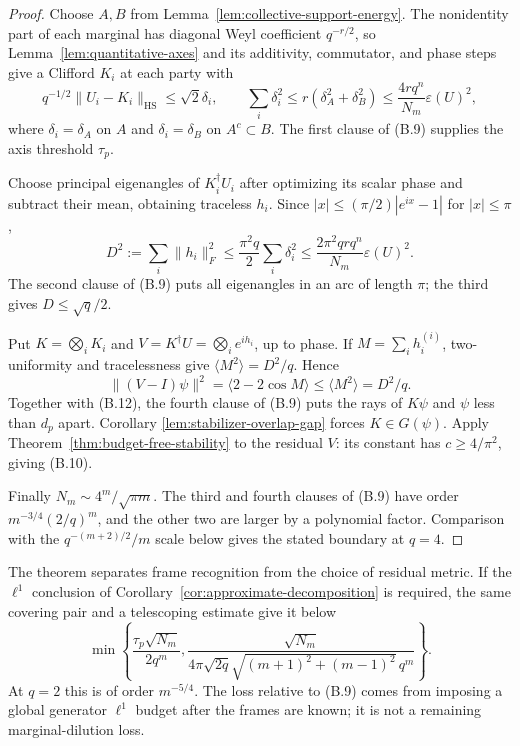 \begin{proof}
Choose \(A,B\) from Lemma~\ref{lem:collective-support-energy}.  The
nonidentity part of each marginal has diagonal Weyl coefficient
\(q^{-r/2}\), so Lemma~\ref{lem:quantitative-axes} and its
additivity, commutator, and phase steps give a Clifford \(K_i\) at each
party with
\[
 q^{-1/2}\lVert U_i-K_i\rVert_{\mathrm{HS}}
 \leq\sqrt2\delta_i,\qquad
 \sum_i\delta_i^2
 \leq r(\delta_A^2+\delta_B^2)
 \leq\frac{4rq^n}{N_m}\varepsilon(U)^2,          \tag{B.11}
\]
where \(\delta_i=\delta_A\) on \(A\) and \(\delta_i=\delta_B\) on
\(A^c\subset B\).  The first clause of (B.9) supplies the axis threshold
\(\tau_p\).

Choose principal eigenangles of \(K_i^\dagger U_i\) after optimizing its
scalar phase and subtract their mean, obtaining traceless \(h_i\).
Since \(|x|\leq(\pi/2)|e^{ix}-1|\) for \(|x|\leq\pi\),
\[
 D^2:=\sum_i\lVert h_i\rVert_F^2
 \leq\frac{\pi^2q}{2}\sum_i\delta_i^2
 \leq\frac{2\pi^2qrq^n}{N_m}\varepsilon(U)^2.   \tag{B.12}
\]
The second clause of (B.9) puts all eigenangles in an arc of length
\(\pi\); the third gives \(D\leq\sqrt q/2\).

Put \(K=\bigotimes_iK_i\) and
\(V=K^\dagger U=\bigotimes_ie^{ih_i}\), up to phase.  If
\(M=\sum_ih_i^{(i)}\), two-uniformity and tracelessness give
\(\langle M^2\rangle=D^2/q\).  Hence
\[
 \lVert(V-I)\psi\rVert^2
 =\langle2-2\cos M\rangle\leq\langle M^2\rangle=D^2/q.
\]
Together with (B.12), the fourth clause of (B.9) puts the rays of
\(K\psi\) and \(\psi\) less than \(d_p\) apart.  Corollary
\ref{lem:stabilizer-overlap-gap} forces \(K\in G(\psi)\).  Apply
Theorem~\ref{thm:budget-free-stability} to the residual \(V\): its
constant has \(c\geq4/\pi^2\), giving (B.10).

Finally \(N_m\sim4^m/\sqrt{\pi m}\).  The third and fourth clauses of
(B.9) have order \(m^{-3/4}(2/q)^m\), and the other two are larger by a
polynomial factor.  Comparison with the
\(q^{-(m+2)/2}/m\) scale below gives the stated boundary at \(q=4\).
\end{proof}

The theorem separates frame recognition from the choice of residual
metric.  If the \(\ell^1\) conclusion of
Corollary~\ref{cor:approximate-decomposition} is required, the same
covering pair and a telescoping estimate give it below
\[
 \min\left\{
  \frac{\tau_p\sqrt{N_m}}{2q^m},
  \frac{\sqrt{N_m}}
       {4\pi\sqrt{2q}\sqrt{(m+1)^2+(m-1)^2}\,q^m}
 \right\}.                                           \tag{B.13}
\]
At \(q=2\) this is of order \(m^{-5/4}\).  The loss relative to (B.9)
comes from imposing a global generator \(\ell^1\) budget after the frames
are known; it is not a remaining marginal-dilution loss.

